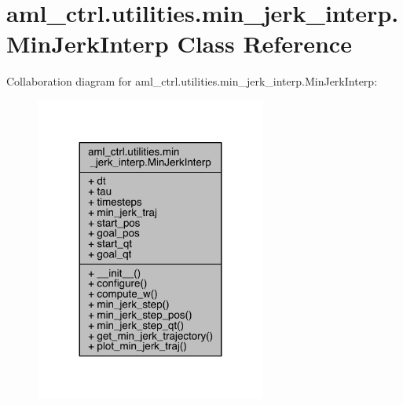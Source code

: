 \hypertarget{classaml__ctrl_1_1utilities_1_1min__jerk__interp_1_1_min_jerk_interp}{}\section{aml\+\_\+ctrl.\+utilities.\+min\+\_\+jerk\+\_\+interp.\+Min\+Jerk\+Interp Class Reference}
\label{classaml__ctrl_1_1utilities_1_1min__jerk__interp_1_1_min_jerk_interp}


Collaboration diagram for aml\+\_\+ctrl.\+utilities.\+min\+\_\+jerk\+\_\+interp.\+Min\+Jerk\+Interp\+:
\nopagebreak
\begin{figure}[H]
\begin{center}
\leavevmode
\includegraphics[width=215pt]{classaml__ctrl_1_1utilities_1_1min__jerk__interp_1_1_min_jerk_interp__coll__graph}
\end{center}
\end{figure}
